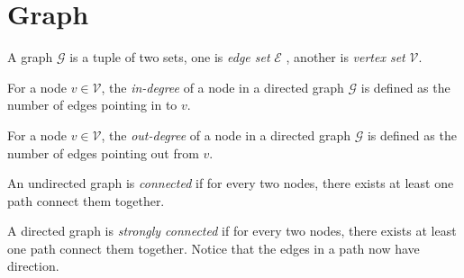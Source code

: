 \section{Graph}
\begin{definition}
	A graph \(\mathcal{G}\) is a tuple of two sets, one is \emph{edge set} \(\mathcal{E}\) , another is \emph{vertex set} \(\mathcal{V}\).
\end{definition}

\begin{definition}
	For a node \(v\in\mathcal{V}\), the \emph{in-degree} of a node in a directed graph \(\mathcal{G}\) is defined as the number of edges pointing in to \(v\).
\end{definition}

\begin{definition}
	For a node \(v\in\mathcal{V}\), the \emph{out-degree} of a node in a directed graph \(\mathcal{G}\) is defined as the number of edges pointing out from \(v\).
\end{definition}

\begin{definition}
	An undirected graph is \emph{connected} if for every two nodes, there exists at least one path connect them together.
\end{definition}

\begin{definition}
	A directed graph is \emph{strongly connected} if for every two nodes, there exists at least one path connect them together. Notice that the edges in a path now
	have direction.
\end{definition}